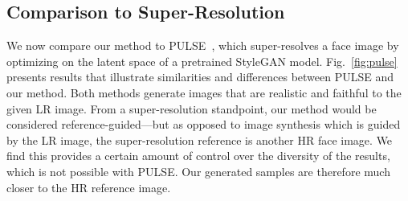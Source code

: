 \subsection{Comparison to Super-Resolution}
\label{sec:superres}

We now compare our method to PULSE~\cite{pulse}, which super-resolves a face image by optimizing on the latent space of a pretrained StyleGAN model. Fig.~\ref{fig:pulse} presents results that illustrate similarities and differences between PULSE and our method. Both methods generate images that are realistic and faithful to the given LR image. 
From a super-resolution standpoint, our method would be considered reference-guided---but as opposed to image synthesis which is guided by the LR image, the super-resolution reference is another HR face image. We find this provides a certain amount of control over the diversity of the results, which is not possible with PULSE. Our generated samples are therefore much closer to the HR reference image.



\begin{table}
\centering
{}
\caption{Diversity and coverage metrics~\cite{divCov} comparison on CelebA-HQ with different HR resolutions.}
\label{tab:diversity}
\end{table}



\begin{table}
\centering
{}
\caption{Quantitative comparison on the AFHQ dataset. We compare our method to the reference-guided i2i methods Stargan-v2~\cite{starganv} where the target and the source image are from the same domain.}
\label{tab:afhq_metrics}
\vspace{-0.5cm}
\end{table}




